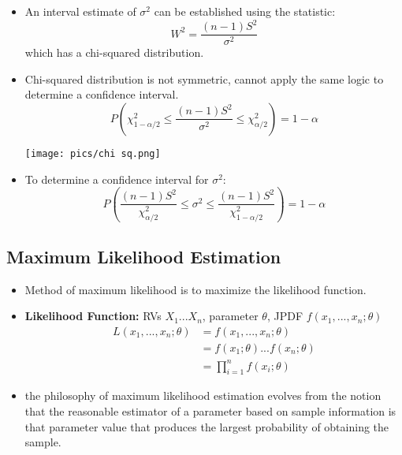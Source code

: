 \documentclass[10pt, letterpaper, twoside]{article}
\newenvironment{Figure}
  {\par\medskip\noindent\minipage{\linewidth}}
  {\endminipage\par\medskip}
\begin{document}
\begin{multicols}{2}
\begin{itemize}
    \item An interval estimate of $\sigma^2$ can be established using the statistic:
    \begin{equation*}
        W^2 = \frac{(n-1)S^2}{\sigma^2}
    \end{equation*}
    which has a chi-squared distribution.
    \item Chi-squared distribution is not symmetric, cannot apply the same logic to determine a confidence interval.
    \begin{equation*}
        P(\chi^2_{1-\alpha/2} \leq \frac{(n-1)S^2}{\sigma^2} \leq \chi^2_{\alpha/2}) = 1 - \alpha
    \end{equation*}
    \begin{Figure}
        \texttt{[image: pics/chi sq.png]}
    \end{Figure}
    \item To determine a confidence interval for $\sigma^2$:
    \begin{equation*}
        P(\frac{(n-1)S^2}{\chi^2_{\alpha/2}} \leq \sigma^2 \leq \frac{(n-1)S^2}{\chi^2_{1-\alpha/2}}) = 1 - \alpha
    \end{equation*}
\end{itemize}

\subsection{Maximum Likelihood Estimation}

\begin{itemize}
    \item Method of maximum likelihood is to maximize the likelihood function.
    \item \textbf{Likelihood Function:} RVs $X_1 ... X_n$, parameter $\theta$, JPDF $f(x_1, ..., x_n; \theta)$
    \begin{align*}
        L(x_1, ..., x_n; \theta) &= f(x_1, ..., x_n; \theta)\\
        &= f(x_1;\theta)...f(x_n;\theta) \\
        &= \prod_{i=1}^n f(x_i;\theta)
    \end{align*}
    \item the philosophy of maximum likelihood estimation evolves from the notion that the reasonable estimator of a parameter based on sample information is that parameter value that produces the largest probability of obtaining the sample.
\end{itemize}


\end{multicols}
\end{document}
